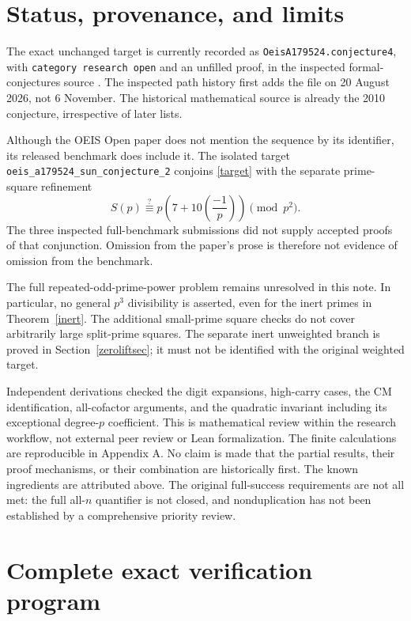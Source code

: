 \documentclass[11pt,a4paper]{article}
\theoremstyle{remark}\newtheorem{remark}[theorem]{Remark}
\begin{document}
\section{Status, provenance, and limits}

The exact unchanged target is currently recorded as
\texttt{OeisA179524.conjecture4}, with \texttt{category research open}
and an unfilled proof, in the inspected formal-conjectures source
\cite{Formal}. The inspected path history first adds the file on
20 August 2026, not 6 November. The historical mathematical source is
already the 2010 conjecture, irrespective of later lists.

Although the OEIS Open paper \cite{OEISOpen} does not mention the
sequence by its identifier, its released benchmark does include it.
The isolated target \texttt{oeis\_a179524\_sun\_conjecture\_2} conjoins
\eqref{target} with the separate prime-square refinement
\[
 S(p)\stackrel{?}{\equiv}
 p\left(7+10\left(\frac{-1}{p}\right)\right)\pmod {p^2}.
\]
The three inspected full-benchmark submissions did not supply accepted
proofs of that conjunction. Omission from the paper's prose is therefore
not evidence of omission from the benchmark.

The full repeated-odd-prime-power problem remains unresolved in this
note. In particular, no general \(p^3\) divisibility is asserted, even
for the inert primes in Theorem~\ref{inert}. The additional small-prime
square checks do not cover arbitrarily large split-prime squares.
The separate inert unweighted branch is proved in
Section~\ref{zeroliftsec}; it must not be identified with the original
weighted target.

Independent derivations checked the digit expansions, high-carry cases,
the CM identification, all-cofactor arguments, and the quadratic
invariant including its exceptional degree-\(p\) coefficient. This is mathematical
review within the research workflow, not external peer review or Lean
formalization. The finite calculations are reproducible in Appendix A.
No claim is made that the partial results, their proof mechanisms, or
their combination are historically first. The known ingredients are
attributed above. The original full-success requirements are not all
met: the full all-\(n\) quantifier is not closed, and nonduplication has
not been established by a comprehensive priority review.

\appendix
\section{Complete exact verification program}
\end{document}
